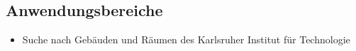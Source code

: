 \subsection{Anwendungsbereiche}

\begin{itemize}
	\item Suche nach Gebäuden und Räumen des Karlsruher Institut für Technologie
\end{itemize}